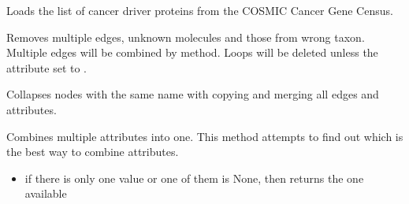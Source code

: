 \documentclass[letterpaper,10pt,english]{sphinxmanual}
\begin{document}
\begin{fulllineitems}
\begin{fulllineitems}
\begin{quote}
\begin{description}
\end{description}\end{quote}

\end{fulllineitems}


\begin{fulllineitems}
\label{\detokenize{main:pypath.main.PyPath.cancer_gene_census_list}}
Loads the list of cancer driver proteins from the COSMIC Cancer
Gene Census.

\end{fulllineitems}


\begin{fulllineitems}
\label{\detokenize{main:pypath.main.PyPath.clean_graph}}
Removes multiple edges, unknown molecules and those from wrong taxon.
Multiple edges will be combined by  method.
Loops will be deleted unless the  attribute set to .

\end{fulllineitems}


\begin{fulllineitems}
\label{\detokenize{main:pypath.main.PyPath.collapse_by_name}}
Collapses nodes with the same name with copying and merging
all edges and attributes.

\end{fulllineitems}


\begin{fulllineitems}
\label{\detokenize{main:pypath.main.PyPath.combine_attr}}
Combines multiple attributes into one. This method attempts
to find out which is the best way to combine attributes.
\begin{itemize}
\item {} 
if there is only one value or one of them is None, then returns
the one available


\end{itemize}
\end{fulllineitems}
\end{fulllineitems}
\end{document}
